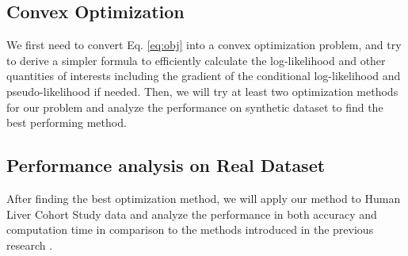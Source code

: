 \documentclass{article}
\begin{document}
\subsection{Convex Optimization}
We first need to convert Eq. \ref{eq:obj} into a convex optimization problem, and try to derive a simpler formula to efficiently calculate the log-likelihood and other quantities of interests including the gradient of the conditional log-likelihood and pseudo-likelihood if needed. Then, we will try at least two optimization methods for our problem and analyze the performance on synthetic dataset to find the best performing method.

\subsection{Performance analysis on Real Dataset}
After finding the best optimization method, we will apply our method to Human Liver Cohort Study data and analyze the performance in both accuracy and computation time in comparison to the methods introduced in the previous research \cite{sohn2012joint}.





\nocite{*}


\end{document}
